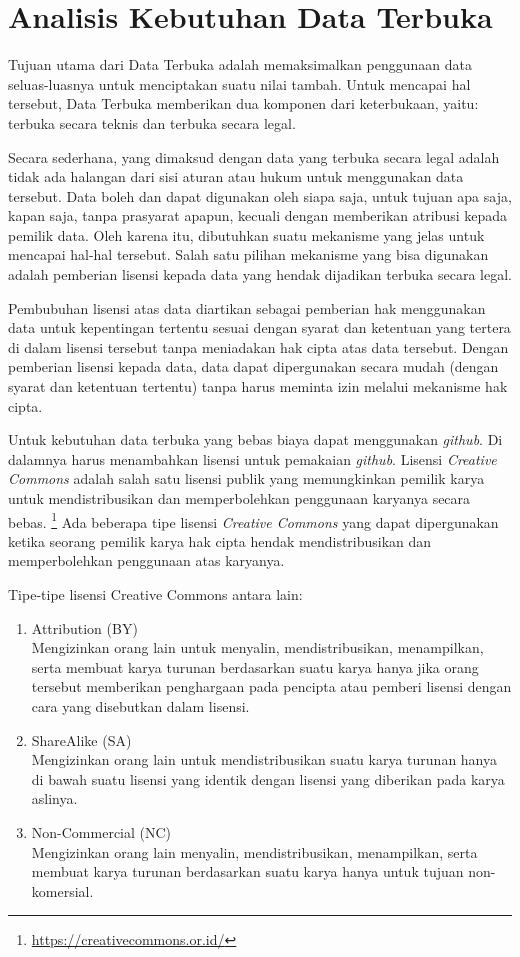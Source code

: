 \section{Analisis Kebutuhan Data Terbuka}
\label{sec: Analisis Kebutuhan Data Terbuka}

Tujuan utama dari Data Terbuka adalah memaksimalkan penggunaan data seluas-luasnya untuk menciptakan suatu nilai tambah. Untuk mencapai hal tersebut, Data Terbuka memberikan dua komponen dari keterbukaan, yaitu: terbuka secara teknis dan terbuka secara legal. 

Secara sederhana, yang dimaksud dengan data yang terbuka secara legal adalah tidak ada halangan dari sisi aturan atau hukum untuk menggunakan data tersebut. Data boleh dan dapat digunakan oleh siapa saja, untuk tujuan apa saja, kapan saja, tanpa prasyarat apapun, kecuali dengan memberikan atribusi kepada pemilik data. Oleh karena itu, dibutuhkan suatu mekanisme yang jelas untuk mencapai hal-hal tersebut. Salah satu pilihan mekanisme yang bisa digunakan adalah pemberian lisensi kepada data yang hendak dijadikan terbuka secara legal.   

Pembubuhan lisensi atas data diartikan sebagai pemberian hak menggunakan data untuk kepentingan tertentu sesuai dengan syarat dan ketentuan yang tertera di dalam lisensi tersebut tanpa meniadakan hak cipta atas data tersebut. Dengan pemberian lisensi kepada data, data dapat dipergunakan secara mudah (dengan syarat dan ketentuan tertentu) tanpa harus meminta izin melalui mekanisme hak cipta. 

Untuk kebutuhan data terbuka yang bebas biaya dapat menggunakan \textit{github}. Di dalamnya harus menambahkan lisensi untuk pemakaian \textit{github}. Lisensi \textit{Creative Commons} adalah salah satu lisensi publik yang memungkinkan pemilik karya untuk mendistribusikan dan memperbolehkan penggunaan karyanya secara bebas. \footnote{\url{https://creativecommons.or.id/}} Ada beberapa tipe lisensi \textit{Creative Commons} yang dapat dipergunakan ketika seorang pemilik karya hak cipta hendak mendistribusikan dan memperbolehkan penggunaan atas karyanya.  

Tipe-tipe lisensi Creative Commons antara lain:
\begin{enumerate}
\item Attribution (BY) \\
Mengizinkan orang lain untuk menyalin, mendistribusikan, menampilkan, serta membuat karya turunan berdasarkan suatu karya hanya jika orang tersebut memberikan penghargaan pada pencipta atau pemberi lisensi dengan cara yang disebutkan dalam lisensi.
\item ShareAlike (SA) \\
Mengizinkan orang lain untuk mendistribusikan suatu karya turunan hanya di bawah suatu lisensi yang identik dengan lisensi yang diberikan pada karya aslinya. 
\item Non-Commercial (NC) \\
Mengizinkan orang lain menyalin, mendistribusikan, menampilkan, serta membuat karya turunan berdasarkan suatu karya hanya untuk tujuan non-komersial.
\end{enumerate}

